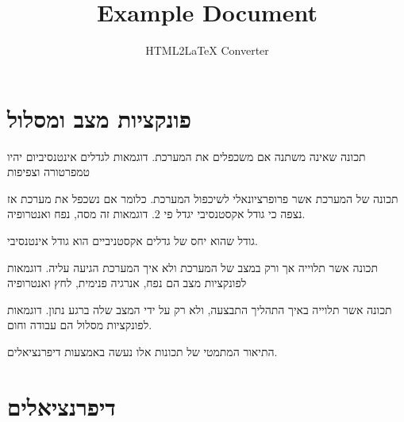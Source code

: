 \documentclass{tstextbook}
\begin{document}
\title{Example Document}
\author{HTML2LaTeX Converter}
\maketitle


\section{פונקציות מצב ומסלול}

\begin{definition}
תכונה שאינה משתנה אם משכפלים את המערכת. דוגמאות לגדלים אינטנסיביום יהיו טמפרטורה וצפיפות

\end{definition}
\begin{definition}
תכונה של המערכת אשר פרופרציונאלי לשיכפול המערכת. כלומר אם נשכפל את מערכת אז נצפה כי גודל אקסטנסיבי יגדל פי 2. דוגמאות זה מסה, נפח ואנטרופיה.

\end{definition}
\begin{proposition}
גודל שהוא יחס של גדלים אקסטניביים הוא גודל אינטנסיבי.

\end{proposition}
\begin{definition}
תכונה אשר תלוייה אך ורק במצב של המערכת ולא איך המערכת הגיעה עליה. דוגמאות לפונקציות מצב הם נפח, אנרגיה פנימית, לחץ ואנטרופיה

\end{definition}
\begin{definition}
תכונה אשר תלוייה באיך התהליך התבצעה, ולא רק על ידי המצב שלה ברגע נתון. דוגמאות לפונקציות מסלול הם עבודה וחום.

\end{definition}
התיאור המתמטי של תכונות אלו נעשה באמצעות דיפרנציאלים.

\section{דיפרנציאלים}
\end{document}
